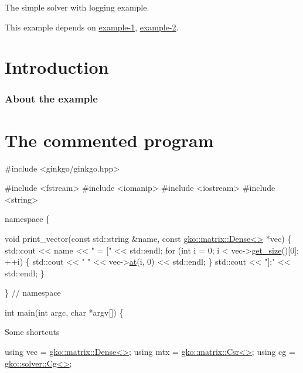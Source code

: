 The simple solver with logging example.

This example depends on \hyperlink{example_1}{example-\/1}, \hyperlink{example_2}{example-\/2}.

 \label{_Intro}%
 \label{_Introduction}%
\section*{Introduction}

\label{_Abouttheexample}%
\subsubsection*{About the example }

\label{_CommProg}%
 \section*{The commented program}


\begin{DoxyCode}
\textcolor{preprocessor}{#include <ginkgo/ginkgo.hpp>}


\textcolor{preprocessor}{#include <fstream>}
\textcolor{preprocessor}{#include <iomanip>}
\textcolor{preprocessor}{#include <iostream>}
\textcolor{preprocessor}{#include <string>}


\textcolor{keyword}{namespace }\{


\textcolor{keywordtype}{void} print\_vector(\textcolor{keyword}{const} std::string &name, \textcolor{keyword}{const} \hyperlink{classgko_1_1matrix_1_1Dense}{gko::matrix::Dense<>} *vec)
\{
    std::cout << name << \textcolor{stringliteral}{" = ["} << std::endl;
    \textcolor{keywordflow}{for} (\textcolor{keywordtype}{int} i = 0; i < vec->\hyperlink{classgko_1_1LinOp_a31b3c003388eb0b95393154f68c2b98d}{get\_size}()[0]; ++i) \{
        std::cout << \textcolor{stringliteral}{"    "} << vec->\hyperlink{classgko_1_1matrix_1_1Dense_af0f1af68853537807ca271a296de3cd0}{at}(i, 0) << std::endl;
    \}
    std::cout << \textcolor{stringliteral}{"];"} << std::endl;
\}


\}  \textcolor{comment}{// namespace}


\textcolor{keywordtype}{int} main(\textcolor{keywordtype}{int} argc, \textcolor{keywordtype}{char} *argv[])
\{
\end{DoxyCode}


Some shortcuts


\begin{DoxyCode}
\textcolor{keyword}{using} vec = \hyperlink{classgko_1_1matrix_1_1Dense}{gko::matrix::Dense<>};
\textcolor{keyword}{using} mtx = \hyperlink{classgko_1_1matrix_1_1Csr}{gko::matrix::Csr<>};
\textcolor{keyword}{using} cg = \hyperlink{classgko_1_1solver_1_1Cg}{gko::solver::Cg<>};
\end{DoxyCode}


